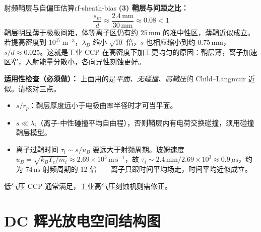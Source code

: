 \begin{example}{射频鞘层与自偏压估算}{rf-sheath-bias}
\textbf{(3) 鞘层与间距之比：}
\[
\frac{s_m}{d} \approx \frac{2.4\,\mathrm{mm}}{30\,\mathrm{mm}} \approx 0.08 < 1
\]
鞘层明显薄于极板间距，体等离子区仍有约 $25\,\mathrm{mm}$ 的准中性区，薄鞘近似成立。若提高密度到 $10^{17}\,\mathrm{m^{-3}}$，$\lambda_D$ 缩小 $\sqrt{10}$ 倍，$s$ 也相应缩小到约 $0.75\,\mathrm{mm}$，$s/d\approx0.025$。这就是工业 CCP 在高密度下加工更均匀的原因：鞘层薄，离子加速区窄，入射能量分散小，各向异性刻蚀更好。

\textbf{适用性检查（必须做）：} 上面用的是\emph{平面、无碰撞、高鞘压}的 Child--Langmuir 近似。请核对三点。
\begin{itemize}[leftmargin=*,itemsep=0pt]
\item $s/r_p$：鞘层厚度远小于电极曲率半径时才可当平面。
\item $s\ll\lambda_{i}$（离子-中性碰撞平均自由程），否则鞘层内有电荷交换碰撞，须用碰撞鞘层模型。
\item 离子过鞘时间 $\tau_i\sim s/u_B$ 要远大于射频周期。玻姆速度 $u_B=\sqrt{k_BT_e/m_i}\approx2.69\times10^{3}\,\mathrm{m\,s^{-1}}$，故 $\tau_i\sim2.4\,\mathrm{mm}/2.69\times10^{3}\approx0.9\,\mu\mathrm{s}$，约为 $74\,\mathrm{ns}$ 射频周期的 12 倍——离子只跟时间平均场走，时间平均近似成立。
\end{itemize}
低气压 CCP 通常满足，工业高气压刻蚀机则需修正。
\end{example}

\section{DC 辉光放电空间结构图}

